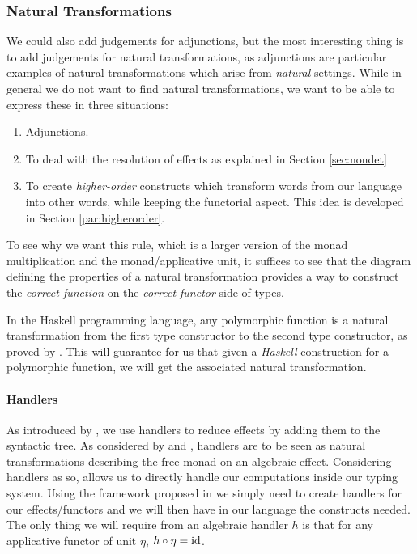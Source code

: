\subsubsection{Natural Transformations}
\label{subsubsec:transnat}
We could also add judgements for adjunctions, but the most interesting thing is
to add judgements for natural transformations, as adjunctions are particular
examples of natural transformations which arise from \emph{natural} settings.
While in general we do not want to find natural transformations, we want to be
able to express these in three situations:
\begin{enumerate}
	\item Adjunctions.
	\item To deal with the resolution of effects as explained in Section
	      \ref{sec:nondet}
	\item To create \emph{higher-order} constructs which transform words from our
	      language into other words, while keeping the functorial aspect.
	      This idea is developed in Section \ref{par:higherorder}.
\end{enumerate}
To see why we want this rule, which is a larger version of the monad
multiplication and the monad/applicative unit, it suffices to see that the
diagram defining the properties of a natural transformation provides a way
to construct the \emph{correct function} on the \emph{correct functor} side of
types.

\smallskip

In the Haskell programming language, any polymorphic function is
a natural transformation from the first type constructor to the second type
constructor, as proved by \cite{wadlerTheoremsFree1989}.
This will guarantee for us that given a \emph{Haskell} construction for a
polymorphic function, we will get the associated natural transformation.

\paragraph{Handlers}
\label{par:handlers}
As introduced by \cite{marsikAlgebraicEffectsHandlers}, we use handlers
to reduce effects by adding them to the syntactic tree.
As considered by \cite{wuEffectHandlersScope2014} and
\cite{vandenbergFrameworkHigherorderEffects2024}, handlers are to be seen
as natural transformations describing the free monad on an algebraic effect.
Considering handlers as so, allows us to directly handle our computations
inside our typing system.
Using the framework proposed in \cite{vandenbergFrameworkHigherorderEffects2024}
we simply need to create handlers for our effects/functors and we will then
have in our language the constructs needed.
The only thing we will require from an algebraic handler $h$ is that for any
applicative functor of unit $\eta$, $h\circ \eta = \mathrm{id}$.

